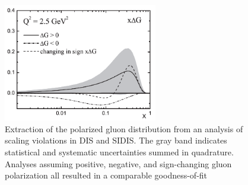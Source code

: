 
\begin{figure}
  \centering
  \includegraphics[width=0.6\textwidth]{figures/lss06_deltag}
  \caption{Extraction of the polarized gluon distribution from an analysis of scaling violations in DIS and SIDIS.  The gray band indicates statistical and systematic uncertainties summed in quadrature.  Analyses assuming positive, negative, and sign-changing gluon polarization all resulted in a comparable goodness-of-fit \cite{Leader:2006xc}}
\end{figure}

